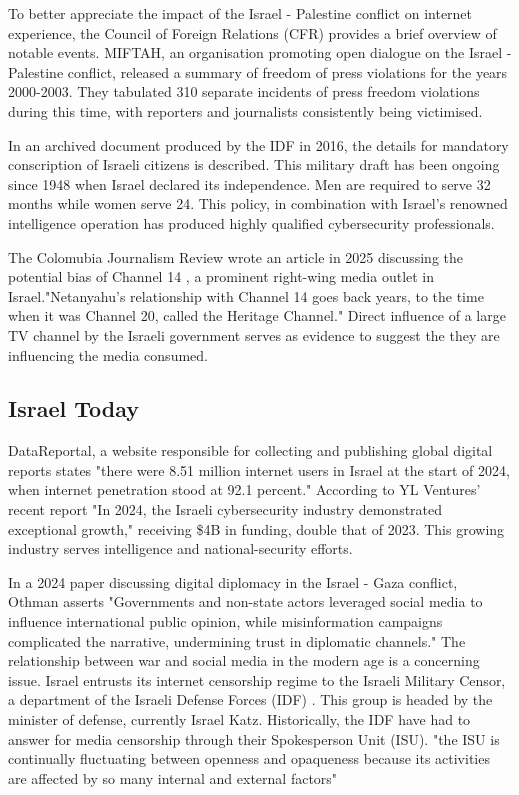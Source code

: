 To better appreciate the impact of the Israel - Palestine conflict on internet experience, the Council of Foreign Relations (CFR) provides a brief overview of notable events. \cite{CFR2024Timeline} MIFTAH, an organisation promoting open dialogue on the Israel - Palestine conflict, released a summary of freedom of press violations for the years 2000-2003. They tabulated 310 separate incidents of press freedom violations during this time, with reporters and journalists consistently being victimised. \cite{Miftah2003Censorship}

In an archived document produced by the IDF in 2016, the details for mandatory conscription of Israeli citizens is described. \cite{MOIA2016IDF} This military draft has been ongoing since 1948 when Israel declared its independence. Men are required to serve 32 months while women serve 24. This policy, in combination with Israel's renowned intelligence operation has produced highly qualified cybersecurity professionals. 

The Colomubia Journalism Review wrote an article in 2025 discussing the potential bias of Channel 14 \cite{c14website}, a prominent right-wing media outlet in Israel."Netanyahu’s relationship with Channel 14 goes back years, to the time when it was Channel 20, called the Heritage Channel." \cite{CJR2024IsraelChannel14} Direct influence of a large TV channel by the Israeli government serves as evidence to suggest the they are influencing the media consumed.

\subsection{Israel Today}
DataReportal, a website responsible for collecting and publishing global digital reports states "there were 8.51 million internet users in Israel at the start of 2024, when internet penetration stood at 92.1 percent." \cite{Digital2024Israel} According to YL Ventures' recent report "In 2024, the Israeli cybersecurity industry demonstrated exceptional growth," receiving \$4B in funding, double that of 2023. This growing industry serves intelligence and national-security efforts. 

In a 2024 paper discussing digital diplomacy in the Israel - Gaza conflict, Othman asserts "Governments and non-state actors leveraged social media to influence international public opinion, while misinformation campaigns complicated the narrative, undermining trust in diplomatic channels." \cite{Othman2025DigitalDiplomacy} The relationship between war and social media in the modern age is a concerning issue. Israel entrusts its internet censorship regime to the Israeli Military Censor, a department of the Israeli Defense Forces (IDF) \cite{idfwebsite}. This group is headed by the minister of defense, currently Israel Katz.\cite{MOD_Israel} Historically, the IDF have had to answer for media censorship through their Spokesperson Unit (ISU). "the ISU is continually fluctuating between openness and opaqueness because its activities are affected by so many internal and external factors" \cite{MAGEN2018287} 

